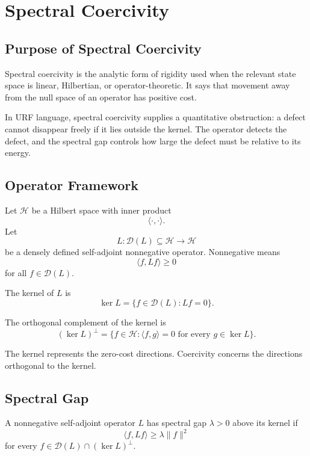 \chapter{Spectral Coercivity}

\section{Purpose of Spectral Coercivity}

Spectral coercivity is the analytic form of rigidity used when the relevant
state space is linear, Hilbertian, or operator-theoretic. It says that
movement away from the null space of an operator has positive cost.

In URF language, spectral coercivity supplies a quantitative obstruction:
a defect cannot disappear freely if it lies outside the kernel. The operator
detects the defect, and the spectral gap controls how large the defect must be
relative to its energy.

\section{Operator Framework}

Let \(\mathcal H\) be a Hilbert space with inner product
\[
\langle\cdot,\cdot\rangle.
\]
Let
\[
L:\mathcal D(L)\subseteq \mathcal H\to \mathcal H
\]
be a densely defined self-adjoint nonnegative operator. Nonnegative means
\[
\langle f,Lf\rangle\ge 0
\]
for all \(f\in\mathcal D(L)\).

\begin{definition}[Kernel]
The kernel of \(L\) is
\[
\ker L=\{f\in\mathcal D(L):Lf=0\}.
\]
\end{definition}

\begin{definition}
The orthogonal complement of the kernel is
\[
{(\ker L)}^\perp=\{f\in\mathcal H:\langle f,g\rangle=0
\text{ for every }g\in\ker L\}.
\]
\end{definition}

The kernel represents the zero-cost directions. Coercivity concerns the
directions orthogonal to the kernel.

\section{Spectral Gap}

\begin{definition}
A nonnegative self-adjoint operator \(L\) has spectral gap \(\lambda>0\) above
its kernel if
\[
\langle f,Lf\rangle\ge \lambda \|f\|^2
\]
for every \(f\in\mathcal D(L)\cap{(\ker L)}^\perp\).
\end{definition}

